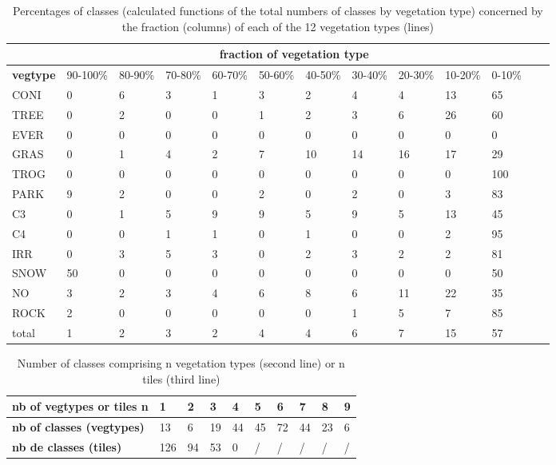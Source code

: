 \begin{table}[h]
\begin{center}
\begin{tabular}{|l|l|l|l|l|l|l|l|l|l|l|l|l|}
\hline
 & \multicolumn{10}{|c|}{\textbf{fraction of vegetation type}} \\
\hline
\textbf{vegtype} & 90-100\% &  80-90\% & 70-80\% & 60-70\% & 50-60\% & 40-50\% & 30-40\% & 20-30\% & 10-20\% & 0-10\% \\
\hline
CONI & 0 &  6  & 3  & 1  & 3  & 2  & 4  & 4 & 13 & 65 \\
\hline
TREE  & 0 &  2 &  0  & 0 &  1 &  2  & 3 &  6 & 26 & 60 \\
\hline
EVER  & 0  & 0  & 0 &  0  & 0  & 0  & 0 &  0 &  0 &  0 \\
\hline
GRAS  & 0 &  1 &  4 &  2  & 7 & 10 & 14 & 16 & 17 & 29 \\
\hline
TROG  & 0  & 0  & 0  & 0  & 0  & 0 &  0  & 0  & 0 & 100 \\
\hline
PARK  & 9 &  2 &  0 &  0 &  2 &  0 &  2 &  0  & 3 & 83 \\
\hline
C3  & 0  & 1 &  5  & 9  & 9  & 5  & 9 &  5 & 13 & 45 \\
\hline
C4  & 0 &  0 &  1 &  1 &  0 &  1 &  0 &  0 &  2 & 95 \\
\hline
IRR  & 0 &  3  & 5  & 3  & 0  & 2 &  3  & 2  & 2 & 81 \\
\hline
SNOW & 50 &  0 &  0 &  0  & 0 &  0  & 0 &  0 &  0 & 50 \\
\hline
NO  & 3  & 2 &  3 &  4 &  6 &  8 &  6 & 11 & 22 & 35 \\
\hline
ROCK  & 2  & 0  & 0 &  0  & 0 &  0  & 1 &  5  & 7 & 85 \\
\hline
total & 1  & 2 &  3  & 2 &  4 &  4 &  6 &  7 & 15 & 57 \\
\hline
\end{tabular}
\end{center}
\caption{Percentages of classes (calculated functions of the total numbers of classes by vegetation type) concerned by 
the fraction (columns) of each of the 12 vegetation types (lines)}
\label{tab10}
\end{table}

\begin{table}[h]
\begin{center}
\begin{tabular}{|l|l|l|l|l|l|l|l|l|l|}
\hline
\textbf{nb of vegtypes or tiles n} & 1 & 2 & 3 & 4 & 5 & 6 & 7 & 8 & 9 \\
 \hline
\textbf{nb of classes (vegtypes)} & 13  & 6  & 19 & 44 & 45 & 72 & 44 & 23 & 6 \\
\hline
\textbf{nb de classes (tiles)} & 126 & 94 & 53 & 0 & / &  / &  / &  / & / \\
\hline
\end{tabular}
\end{center}
\caption{Number of classes comprising n vegetation types (second line) or n tiles (third line)}
\label{tab11}
\end{table}


